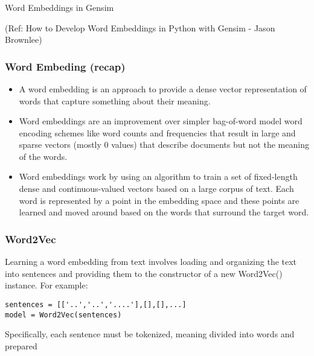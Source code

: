 \begin{frame}[fragile]\frametitle{}

\begin{center}
{\Large Word Embeddings in Gensim}

{\tiny (Ref: How to Develop Word Embeddings in Python with Gensim - Jason Brownlee)}
\end{center}

\end{frame}

\begin{frame}[fragile]\frametitle{Word Embeding (recap)}

\begin{itemize}
\item A word embedding is an approach to provide a dense vector representation of words that capture something about their meaning.

\item Word embeddings are an improvement over simpler bag-of-word model word encoding schemes like word counts and frequencies that result in large and sparse vectors (mostly 0 values) that describe documents but not the meaning of the words.

\item Word embeddings work by using an algorithm to train a set of fixed-length dense and continuous-valued vectors based on a large corpus of text. Each word is represented by a point in the embedding space and these points are learned and moved around based on the words that surround the target word.
\end{itemize}
\end{frame}


\begin{frame}[fragile]\frametitle{Word2Vec }

Learning a word embedding from text involves loading and organizing the text into sentences and providing them to the constructor of a new Word2Vec() instance. For example:
\begin{lstlisting}
sentences = [['..','..','....'],[],[],...]
model = Word2Vec(sentences)
\end{lstlisting}
Specifically, each sentence must be tokenized, meaning divided into words and prepared 
\end{frame}


